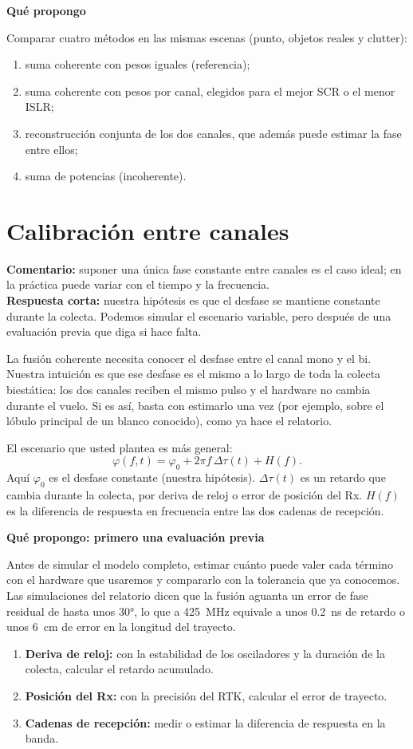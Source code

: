 \documentclass[11pt,a4paper]{article}
\newcommand{\encorto}[2]{\par\noindent\colorbox{acento!7}{\parbox{\dimexpr\linewidth-2\fboxsep}{%
\small\textbf{Comentario:} #1\\[1pt]\textbf{Respuesta corta:} #2}}\par\smallskip}
\newcommand{\paso}[1]{\par\smallskip\needspace{5\baselineskip}\noindent\textbf{\color{acento}#1}\par}
\begin{document}
\paso{Qué propongo}
Comparar cuatro métodos en las mismas escenas (punto, objetos reales y clutter):
\begin{enumerate}
  \item suma coherente con pesos iguales (referencia);
  \item suma coherente con pesos por canal, elegidos para el mejor SCR o el menor ISLR;
  \item reconstrucción conjunta de los dos canales, que además puede estimar la fase entre
  ellos;
  \item suma de potencias (incoherente).
\end{enumerate}

\section{Calibración entre canales}

\encorto{suponer una única fase constante entre canales es el caso ideal; en la práctica
puede variar con el tiempo y la frecuencia.}
{nuestra hipótesis es que el desfase se mantiene constante durante la colecta. Podemos
simular el escenario variable, pero después de una evaluación previa que diga si hace falta.}

La fusión coherente necesita conocer el desfase entre el canal mono y el bi. Nuestra
intuición es que ese desfase es el mismo a lo largo de toda la colecta biestática: los dos
canales reciben el mismo pulso y el hardware no cambia durante el vuelo. Si es así, basta
con estimarlo una vez (por ejemplo, sobre el lóbulo principal de un blanco conocido), como
ya hace el relatorio.

El escenario que usted plantea es más general:
\[
  \varphi(f,t) = \varphi_0 + 2\pi f\,\Delta\tau(t) + H(f).
\]
Aquí $\varphi_0$ es el desfase constante (nuestra hipótesis). $\Delta\tau(t)$ es un
retardo que cambia durante la colecta, por deriva de reloj o error de posición del Rx.
$H(f)$ es la diferencia de respuesta en frecuencia entre las dos cadenas de recepción.

\paso{Qué propongo: primero una evaluación previa}
Antes de simular el modelo completo, estimar cuánto puede valer cada término con el
hardware que usaremos y compararlo con la tolerancia que ya conocemos. Las simulaciones del
relatorio dicen que la fusión aguanta un error de fase residual de hasta unos 30°, lo que a
425~MHz equivale a unos 0.2~ns de retardo o unos 6~cm de error en la longitud del trayecto.
\begin{enumerate}
  \item \textbf{Deriva de reloj:} con la estabilidad de los osciladores y la duración de la
  colecta, calcular el retardo acumulado.
  \item \textbf{Posición del Rx:} con la precisión del RTK, calcular el error de trayecto.
  \item \textbf{Cadenas de recepción:} medir o estimar la diferencia de respuesta en la
  banda.
\end{enumerate}
\end{document}
